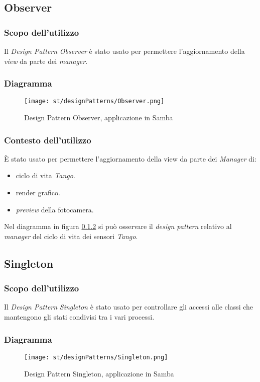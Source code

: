 \subsection{Observer}
\subsubsection{Scopo dell'utilizzo}
Il \emph{Design Pattern} \emph{Observer} è stato usato per permettere l'aggiornamento della \emph{view} da parte dei \emph{manager}.
\subsubsection{Diagramma}\label{dia:ObserverPattern}
\begin{figure}[H] 
    \centering 
    \texttt{[image: st/designPatterns/Observer.png]} 
    \caption{Design Pattern Observer, applicazione in Samba}
\end{figure}
\subsubsection{Contesto dell'utilizzo}
È stato usato per permettere l'aggiornamento della view da parte dei \emph{Manager} di:
\begin{itemize}
	\item ciclo di vita \emph{Tango}.
	\item render grafico.
	\item \emph{preview} della fotocamera.
\end{itemize}
Nel diagramma in figura \ref{dia:ObserverPattern} si può osservare il \emph{design pattern} relativo al \emph{manager} del ciclo di vita dei sensori \emph{Tango}.

\subsection{Singleton}
\subsubsection{Scopo dell'utilizzo}
Il \emph{Design Pattern} \emph{Singleton} è stato usato per controllare gli accessi alle classi che mantengono gli stati condivisi tra i vari processi. 
\subsubsection{Diagramma}
\begin{figure}[H] 
    \centering 
    \texttt{[image: st/designPatterns/Singleton.png]} 
    \caption{Design Pattern Singleton, applicazione in Samba}
\end{figure}
